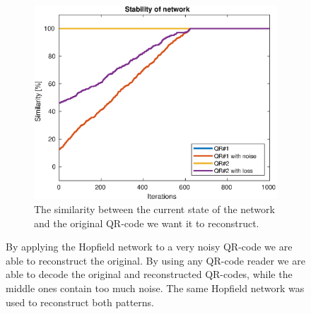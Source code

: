 \begin{figure}[H]
\begin{subfigure}{0.49\textwidth}
        \includegraphics[width=\textwidth]{figs/qr-code-sim}
        \caption{The similarity between the current state of the network and the original QR-code we want it to reconstruct.}
        \label{fig:qr-codes-stability}
    \end{subfigure}
    \caption{By applying the Hopfield network to a very noisy QR-code we are able to reconstruct the original. By using any QR-code reader we are able to decode the original and reconstructed QR-codes, while the middle ones contain too much noise. The same Hopfield network was used to reconstruct both patterns.}
\end{figure}

